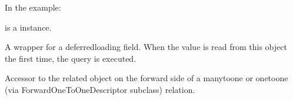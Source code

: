 \documentclass[letterpaper,10pt,english]{sphinxmanual}
\begin{document}
\begin{fulllineitems}
\begin{fulllineitems}
\sphinxAtStartPar
In the example:

\begin{sphinxVerbatim}[commandchars=\\\{\}]
 
       
\end{sphinxVerbatim}

\sphinxAtStartPar
{} is a  instance.

\end{fulllineitems}


\begin{fulllineitems}
\label{\detokenize{app:app.models.interfaceConnector.connecteur_id}}
\pysigstartsignatures
{}
\pysigstopsignatures
\end{fulllineitems}


\begin{fulllineitems}
\label{\detokenize{app:app.models.interfaceConnector.id}}
\pysigstartsignatures
{}
\pysigstopsignatures
\sphinxAtStartPar
A wrapper for a deferred\sphinxhyphen{}loading field. When the value is read from this
object the first time, the query is executed.

\end{fulllineitems}


\begin{fulllineitems}
\label{\detokenize{app:app.models.interfaceConnector.interface}}
\pysigstartsignatures
{}
\pysigstopsignatures
\sphinxAtStartPar
Accessor to the related object on the forward side of a many\sphinxhyphen{}to\sphinxhyphen{}one or
one\sphinxhyphen{}to\sphinxhyphen{}one (via ForwardOneToOneDescriptor subclass) relation.


\end{fulllineitems}
\end{fulllineitems}
\end{document}
